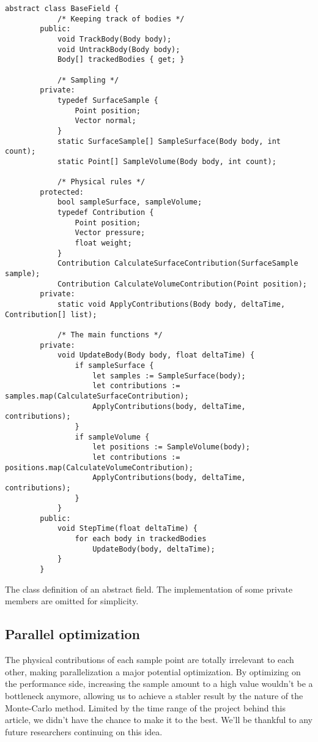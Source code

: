 \begin{table}[htb]
	\begin{lstlisting}[style=sharpc]
		abstract class BaseField {
			/* Keeping track of bodies */
		public:
			void TrackBody(Body body);
			void UntrackBody(Body body);
			Body[] trackedBodies { get; }

			/* Sampling */
		private:
			typedef SurfaceSample {
				Point position;
				Vector normal;
			}
			static SurfaceSample[] SampleSurface(Body body, int count);
			static Point[] SampleVolume(Body body, int count);

			/* Physical rules */
		protected:
			bool sampleSurface, sampleVolume;
			typedef Contribution {
				Point position;
				Vector pressure;
				float weight;
			}
			Contribution CalculateSurfaceContribution(SurfaceSample sample);
			Contribution CalculateVolumeContribution(Point position);
		private:
			static void ApplyContributions(Body body, deltaTime, Contribution[] list);

			/* The main functions */
		private:
			void UpdateBody(Body body, float deltaTime) {
				if sampleSurface {
					let samples := SampleSurface(body);
					let contributions := samples.map(CalculateSurfaceContribution);
					ApplyContributions(body, deltaTime, contributions);
				}
				if sampleVolume {
					let positions := SampleVolume(body);
					let contributions := positions.map(CalculateVolumeContribution);
					ApplyContributions(body, deltaTime, contributions);
				}
			}
		public:
			void StepTime(float deltaTime) {
				for each body in trackedBodies
					UpdateBody(body, deltaTime);
			}
		}
	\end{lstlisting}
	\caption{
		The class definition of an abstract field.
		The implementation of some private members are omitted for simplicity.
	}
	\label{table:basefield-definition}
\end{table}

\subsection{Parallel optimization}

The physical contributions of each sample point are totally irrelevant to each other, making parallelization a major potential optimization.
By optimizing on the performance side, increasing the sample amount to a high value wouldn't be a bottleneck anymore, allowing us to achieve a stabler result by the nature of the Monte-Carlo method.
Limited by the time range of the project behind this article, we didn't have the chance to make it to the best.
We'll be thankful to any future researchers continuing on this idea.